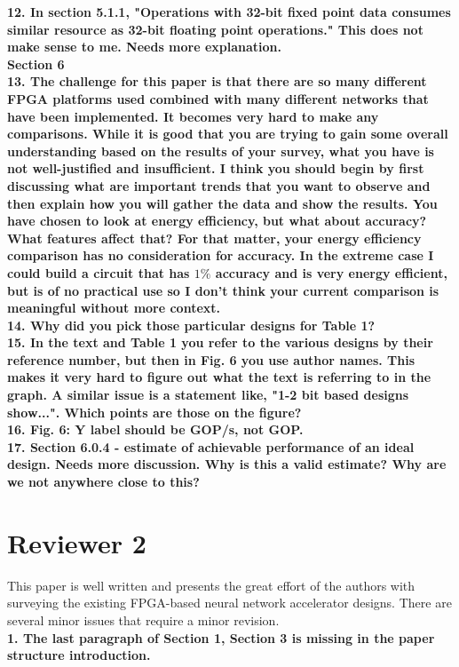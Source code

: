 \documentclass[12pt]{paper}
\newcommand{\reviewer}[1]{\section*{Reviewer #1}}
\newcommand{\comment}[1]{\noindent\textbf{#1}\\}
\begin{document}
\comment{12. In section 5.1.1, "Operations with 32-bit fixed point data consumes similar resource as 32-bit floating point operations." This does not make sense to me. Needs more explanation.}

{\noindent\textbf{Section 6}}\\

\comment{13. The challenge for this paper is that there are so many different FPGA platforms used combined with many different networks that have been implemented.  It becomes very hard to make any comparisons.  While it is good that you are trying to gain some overall understanding based on the results of your survey, what you have is not well-justified and insufficient. I think you should begin by first discussing what are important trends that you want to observe and then explain how you will gather the data and show the results. You have chosen to look at energy efficiency, but what about accuracy? What features affect that?  For that matter, your energy efficiency comparison has no consideration for accuracy. In the extreme case I could build a circuit that has $1\%$ accuracy and is very energy efficient, but is of no practical use so I don't think your current comparison is meaningful without more context.}

\comment{14. Why did you pick those particular designs for Table 1?}

\comment{15. In the text and Table 1 you refer to the various designs by their reference number, but then in Fig. 6 you use author names. This makes it very hard to figure out what the text is referring to in the graph. A similar issue is a statement like, "1-2 bit based designs show...".  Which points are those on the figure?}

\comment{16. Fig. 6: Y label should be GOP/s, not GOP.}

\comment{17. Section 6.0.4 - estimate of achievable performance of an ideal design.  Needs more discussion. Why is this a valid estimate? Why are we not anywhere close to this?}

\reviewer{2}

This paper is well written and presents the great effort of the authors with surveying the existing FPGA-based neural network accelerator designs. There are several minor issues that require a minor revision.\\

\comment{1.	The last paragraph of Section 1, Section 3 is missing in the paper structure introduction.}
\end{document}
